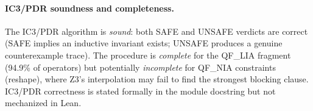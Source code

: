 \documentclass[11pt]{article}
\begin{document}
\paragraph{IC3/PDR soundness and completeness.}
The IC3/PDR algorithm is \emph{sound}: both SAFE and UNSAFE verdicts
are correct (SAFE implies an inductive invariant exists; UNSAFE
produces a genuine counterexample trace).  The procedure is
\emph{complete} for the QF\_LIA fragment (94.9\% of operators)
but potentially \emph{incomplete} for QF\_NIA constraints (reshape),
where Z3's interpolation may fail to find the strongest blocking
clause.  IC3/PDR correctness is stated formally in the module
docstring but not mechanized in Lean.
\end{document}
